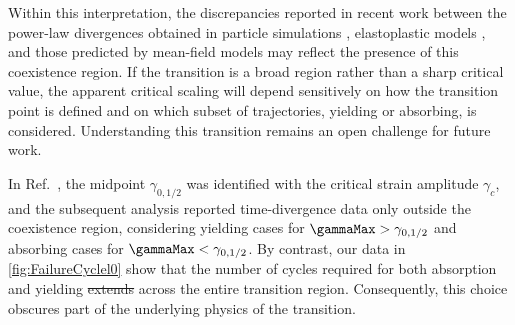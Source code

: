 \documentclass[asymmetricmargins]{library/duthesis}%
\providecommand{\DIFadd}[1]{{\protect\color{blue}\uwave{#1}}} %
\providecommand{\DIFdel}[1]{{\protect\color{red}\sout{#1}}}                      %
\providecommand{\DIFaddbegin}{} %
\providecommand{\DIFaddend}{} %
\providecommand{\DIFdelbegin}{} %
\providecommand{\DIFdelend}{} %
\begin{document}
Within this interpretation, the discrepancies reported in recent work between the power-law divergences obtained in particle simulations \cite{Maity2026,khandareElastoplasticModellingCyclic2026,kawasakiMacroscopicYieldingJammed2016}, elastoplastic models \cite{khandareElastoplasticModellingCyclic2026}, and those predicted by mean-field models \cite{parleyMeanFieldTheoryYielding2022,sarkar2025coarsegraineddescriptionsdynamics} may reflect the presence of this coexistence region. If the transition is a broad region rather than a sharp critical value, the apparent critical scaling will depend sensitively on how the transition point is defined and on which subset of trajectories, yielding or absorbing, is considered. Understanding this transition remains an open challenge for future work.

In Ref.~\cite{khandareElastoplasticModellingCyclic2026}, the midpoint $\gamma_{0,1/2}$ was identified with the critical strain amplitude $\gamma_c$, and the subsequent analysis reported time-divergence data only outside the coexistence region, considering yielding cases for $\gammaMax > \gamma_{0,1/2}$ and absorbing cases for $\gammaMax < \gamma_{0,1/2}$. By contrast, our data in \cref{fig:FailureCyclel0} show that the number of cycles required for both absorption and yielding \DIFdelbegin \DIFdel{extends }\DIFdelend \DIFaddbegin \DIFadd{increases }\DIFaddend across the entire transition region. Consequently, this choice obscures part of the underlying physics of the transition.
\end{document}
